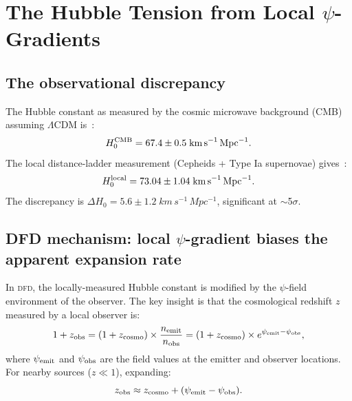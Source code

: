 \documentclass[aps,prd,twocolumn,superscriptaddress,nofootinbib,longbibliography]{revtex4-2}
\newcommand{\DFD}{\textsc{dfd}}
\begin{document}
\section{The Hubble Tension from Local $\psi$-Gradients}\label{sec:Hubble}

\subsection{The observational discrepancy}\label{sec:H0-discrepancy}

The Hubble constant as measured by the cosmic microwave background
(CMB) assuming $\Lambda$CDM is~\cite{Planck2020}:
\begin{equation}
H_0^{\rm CMB} = 67.4 \pm 0.5\;\si{km\,s^{-1}\,Mpc^{-1}}.
\end{equation}
The local distance-ladder measurement (Cepheids + Type Ia
supernovae) gives~\cite{Riess2022}:
\begin{equation}
H_0^{\rm local} = 73.04 \pm 1.04\;\si{km\,s^{-1}\,Mpc^{-1}}.
\end{equation}
The discrepancy is $\Delta H_0 = 5.6 \pm 1.2\;\si{km\,s^{-1}\,Mpc^{-1}}$,
significant at $\sim$5$\sigma$.

\subsection{DFD mechanism: local $\psi$-gradient biases the
apparent expansion rate}\label{sec:mechanism}

In \DFD, the locally-measured Hubble constant is modified by the
$\psi$-field environment of the observer. The key insight is that
the cosmological redshift $z$ measured by a local observer is:
\begin{equation}\label{eq:redshift-DFD}
1 + z_{\rm obs} = (1+z_{\rm cosmo})\times\frac{n_{\rm emit}}{n_{\rm obs}}
= (1+z_{\rm cosmo})\times e^{\psi_{\rm emit} - \psi_{\rm obs}},
\end{equation}
where $\psi_{\rm emit}$ and $\psi_{\rm obs}$ are the field values at the
emitter and observer locations. For nearby sources ($z \ll 1$), expanding:
\begin{equation}\label{eq:z-expand}
z_{\rm obs} \approx z_{\rm cosmo} + (\psi_{\rm emit} - \psi_{\rm obs}).
\end{equation}
\end{document}
